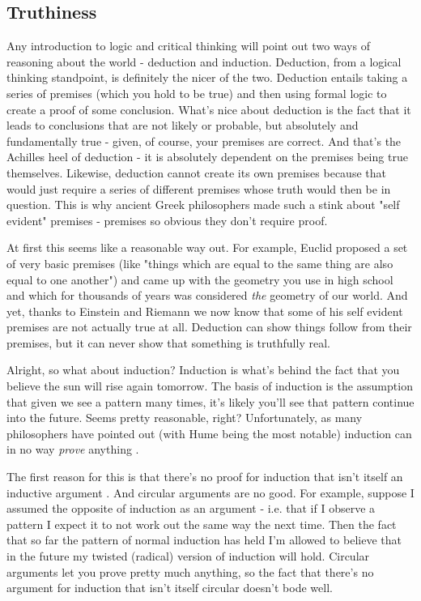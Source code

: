 \documentclass[11pt]{book}
\begin{document}
\subsection{Truthiness}
Any introduction to logic and critical thinking will point out two ways of reasoning about the world - deduction and induction. Deduction, from a logical thinking standpoint, is definitely the nicer of the two. Deduction entails taking a series of premises (which you hold to be true) and then using formal logic to create a proof of some conclusion. What's nice about deduction is the fact that it leads to conclusions that are not likely or probable, but absolutely and fundamentally true - given, of course, your premises are correct. And that's the Achilles heel of deduction - it is absolutely dependent on the premises being true themselves. Likewise, deduction cannot create its own premises because that would just require a series of different premises whose truth would then be in question. This is why ancient Greek philosophers made such a stink about "self evident" premises - premises so obvious they don't require proof. 
\newline

At first this seems like a reasonable way out. For example, Euclid proposed a set of very basic premises (like "things which are equal to the same thing are also equal to one another") and came up with the geometry you use in high school and which for thousands of years was considered \textit{the} geometry of our world. And yet, thanks to Einstein and Riemann we now know that some of his self evident premises are not actually true at all. Deduction can show things follow from their premises, but it can never show that something is truthfully real.
\newline

Alright, so what about induction? Induction is what's behind the fact that you believe the sun will rise again tomorrow. The basis of induction is the assumption that given we see a pattern many times, it's likely you'll see that pattern continue into the future. Seems pretty reasonable, right? Unfortunately, as many philosophers have pointed out (with Hume being the most notable) induction can in no way \textit{prove} anything \cite{lipton}.
\newline

The first reason for this is that there's no proof for induction that isn't itself an inductive argument \cite{lipton}. And circular arguments are no good. For example, suppose I assumed the opposite of induction as an argument - i.e. that if I observe a pattern I expect it to not work out the same way the next time. Then the fact that so far the pattern of normal induction has held I'm allowed to believe that in the future my twisted (radical) version of induction will hold. Circular arguments let you prove pretty much anything, so the fact that there's no argument for induction that isn't itself circular doesn't bode well.
\newline
\end{document}
